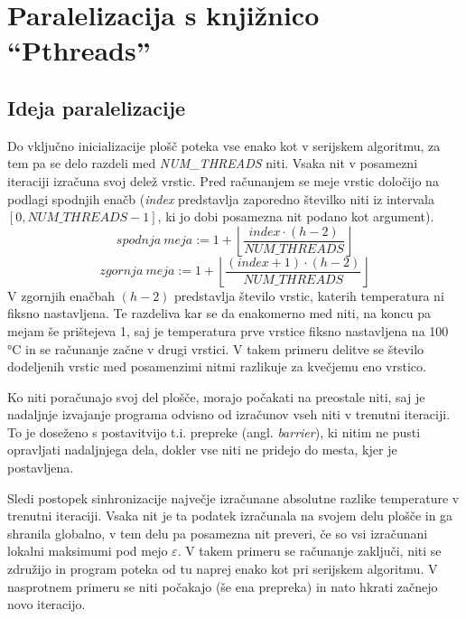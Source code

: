 \documentclass[a4paper,titlepage,11pt]{article}
\begin{document}
\pagebreak

\section{Paralelizacija s knjižnico ``Pthreads''}
\label{poglavje-pthreads}

\subsection{Ideja paralelizacije} \label{poglavje-ideja-paralelizacije-2}

Do vključno inicializacije plošč poteka vse enako kot v serijskem algoritmu, za tem pa se delo razdeli med \textit{NUM\_THREADS} niti. Vsaka nit v posamezni iteraciji izračuna svoj delež vrstic. Pred računanjem se meje vrstic določijo na podlagi spodnjih enačb (\textit{index} predstavlja zaporedno številko niti iz intervala $\left[0, NUM\_THREADS - 1\right]$, ki jo dobi posamezna nit podano kot argument).
\begin{equation}
spodnja \ meja := 1 + \left \lfloor{\frac{index \cdot (h - 2)}{NUM\_THREADS}}\right \rfloor
\end{equation}
\begin{equation}
zgornja \ meja := 1 + \left \lfloor{\frac{(index+1) \cdot (h - 2)}{NUM\_THREADS}}\right \rfloor
\end{equation}
V zgornjih enačbah $(h - 2)$ predstavlja število vrstic, katerih temperatura ni fiksno nastavljena. Te razdeliva kar se da enakomerno med niti, na koncu pa mejam še prištejeva 1, saj je temperatura prve vrstice fiksno nastavljena na 100 °C in se računanje začne v drugi vrstici. V takem primeru delitve se število dodeljenih vrstic med posamenzimi nitmi razlikuje za kvečjemu eno vrstico.

Ko niti poračunajo svoj del plošče, morajo počakati na preostale niti, saj je nadaljnje izvajanje programa odvisno od izračunov vseh niti v trenutni iteraciji. To je doseženo s postavitvijo t.i. prepreke (angl. \textit{barrier}), ki nitim ne pusti opravljati nadaljnjega dela, dokler vse niti ne pridejo do mesta, kjer je postavljena.

Sledi postopek sinhronizacije največje izračunane absolutne razlike temperature v trenutni iteraciji. Vsaka nit je ta podatek izračunala na svojem delu plošče in ga shranila globalno, v tem delu pa posamezna nit preveri, če so vsi izračunani lokalni maksimumi pod mejo \(\varepsilon\). V takem primeru se računanje zaključi, niti se združijo in program poteka od tu naprej enako kot pri serijskem algoritmu. V nasprotnem primeru se niti počakajo (še ena prepreka) in nato hkrati začnejo novo iteracijo.
\end{document}
